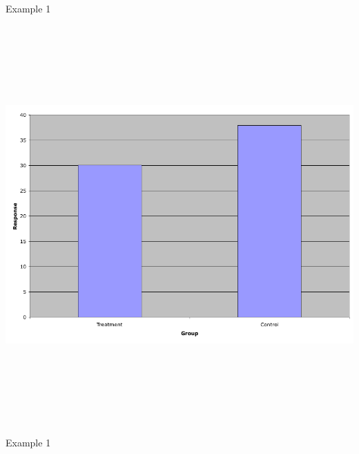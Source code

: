 \documentclass[12pt]{article}
\newcommand{\headsize}{\fontsize{35}{35} \selectfont}
\begin{document}
\newpage


\headsize \color{yellow}
\hfill \begin{minipage}{5.75in}
\centering
Example 1
\end{minipage}

\vspace{30mm}

\centerline{\includegraphics[height=6in]{Figs/fig1d.png}}


\newpage


\headsize \color{yellow}
\hfill \begin{minipage}{5.75in}
\centering
Example 1
\end{minipage}

\vspace{30mm}
\end{document}
